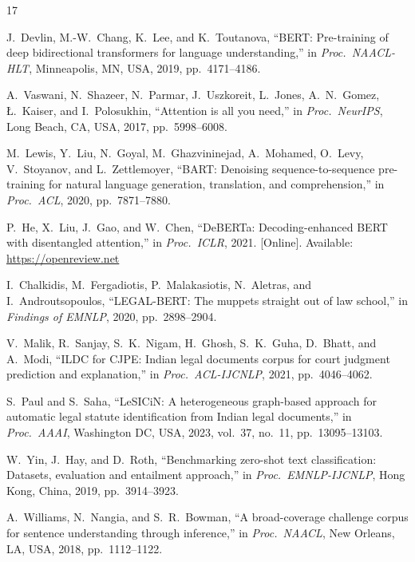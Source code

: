 \documentclass[conference]{IEEEtran}
\begin{document}
\begin{thebibliography}{17}

J.~Devlin, M.-W.~Chang, K.~Lee, and K.~Toutanova,
``BERT: Pre-training of deep bidirectional transformers for language understanding,''
in \textit{Proc.\ NAACL-HLT}, Minneapolis, MN, USA, 2019, pp.~4171--4186.

A.~Vaswani, N.~Shazeer, N.~Parmar, J.~Uszkoreit, L.~Jones, A.~N.~Gomez,
{\L}.~Kaiser, and I.~Polosukhin,
``Attention is all you need,''
in \textit{Proc.\ NeurIPS}, Long Beach, CA, USA, 2017, pp.~5998--6008.

M.~Lewis, Y.~Liu, N.~Goyal, M.~Ghazvininejad, A.~Mohamed, O.~Levy,
V.~Stoyanov, and L.~Zettlemoyer,
``BART: Denoising sequence-to-sequence pre-training for natural language
generation, translation, and comprehension,''
in \textit{Proc.\ ACL}, 2020, pp.~7871--7880.

P.~He, X.~Liu, J.~Gao, and W.~Chen,
``DeBERTa: Decoding-enhanced BERT with disentangled attention,''
in \textit{Proc.\ ICLR}, 2021. [Online]. Available: \url{https://openreview.net}

I.~Chalkidis, M.~Fergadiotis, P.~Malakasiotis, N.~Aletras, and
I.~Androutsopoulos,
``LEGAL-BERT: The muppets straight out of law school,''
in \textit{Findings of EMNLP}, 2020, pp.~2898--2904.

V.~Malik, R.~Sanjay, S.~K.~Nigam, H.~Ghosh, S.~K.~Guha, D.~Bhatt, and
A.~Modi,
``ILDC for CJPE: Indian legal documents corpus for court judgment prediction
and explanation,''
in \textit{Proc.\ ACL-IJCNLP}, 2021, pp.~4046--4062.

S.~Paul and S.~Saha,
``LeSICiN: A heterogeneous graph-based approach for automatic legal statute
identification from Indian legal documents,''
in \textit{Proc.\ AAAI}, Washington DC, USA, 2023, vol.~37, no.~11,
pp.~13095--13103.

W.~Yin, J.~Hay, and D.~Roth,
``Benchmarking zero-shot text classification: Datasets, evaluation and
entailment approach,''
in \textit{Proc.\ EMNLP-IJCNLP}, Hong Kong, China, 2019, pp.~3914--3923.

A.~Williams, N.~Nangia, and S.~R.~Bowman,
``A broad-coverage challenge corpus for sentence understanding through
inference,''
in \textit{Proc.\ NAACL}, New Orleans, LA, USA, 2018, pp.~1112--1122.


\end{thebibliography}
\end{document}

